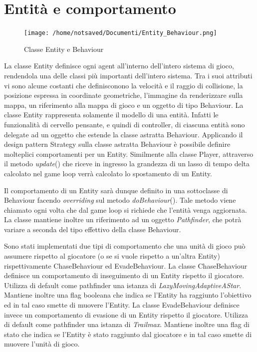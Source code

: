 \documentclass[12pt]{book}
\begin{document}
\section{Entit\`a e comportamento}
\begin{figure}[htp]
\centering
\texttt{[image: /home/notsaved/Documenti/Entity\_Behaviour.png]}
\caption{Classe Entity e Behaviour}
\label{entity_behaviour}
\end{figure}
\par{La classe Entity definisce ogni agent all'interno dell'intero sistema di gioco, rendendola una delle classi pi\`u importanti dell'intero sistema. Tra i suoi attributi vi sono alcune costanti che definisconono la velocit\`a e il raggio di collisione, la posizione espressa in coordinate geometriche, l'immagine da renderizzare sulla mappa, un riferimento alla mappa di gioco e un oggetto di tipo Behaviour. La classe Entity rappresenta solamente il modello di una entit\`a. Infatti le funzionalit\`a di cervello pensante, e quindi di controller, di ciascuna entit\`a sono delegate ad un oggetto che estende la classe astratta Behaviour. Applicando il design pattern Strategy sulla classe astratta Behaviour \`e possibile definire molteplici comportamenti per un Entity. Similmente alla classe Player, attraverso il metodo \emph{update}() che riceve in ingresso la grandezza di un lasso di tempo delta calcolato nel game loop verr\`a calcolato lo spostamento di un Entity.}
\par{Il comportamento di un Entity sar\`a dunque definito in una sottoclasse di Behaviour facendo \emph{overriding} sul metodo \emph{doBehaviour}(). Tale metodo viene chiamato ogni volta che dal game loop si richiede che l'entit\`a venga aggiornata. La classe mantiene inoltre un riferimento ad un oggetto \emph{Pathfinder}, che potr\`a variare a seconda del tipo effettivo della classe Behaviour.}
\par{Sono stati implementati due tipi di comportamento che una unit\`a di gioco pu\`o assumere rispetto al giocatore (o se si vuole rispetto a un'altra Entity) rispettivamente ChaseBehaviour ed EvadeBehaviour. La classe ChaseBehaviour definisce un comportamento di inseguimento di un Entity rispetto il giocatore. Utilizza di default come pathfinder una istanza di \emph{LazyMovingAdaptiveAStar}. Mantiene inoltre una flag booleana che indica se l'Entity ha raggiunto l'obiettivo ed in tal caso smette di muovere l'Entity. La classe EvadeBehaviour definisce invece un comportamento di evasione di un Entity rispetto il giocatore. Utilizza di default come pathfinder una istanza di \emph{Trailmax}. Mantiene inoltre una flag di stato che indica se l'Entity \`e stato raggiunto dal giocatore e in tal caso smette di muovere l'unit\`a di gioco.}
\end{document}
